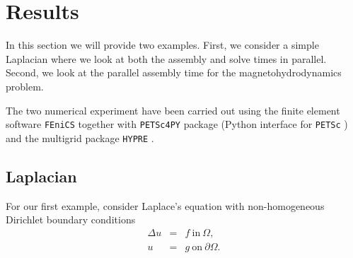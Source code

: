 \documentclass[11pt]{article}
\newcommand{\fenics}{{\tt FEniCS} }
\begin{document}

\cite{scotch}

\section{Results}

In this section we will provide two examples. First, we consider a simple Laplacian where we look at both the assembly and solve times in parallel. Second, we look at the parallel assembly time for the magnetohydrodynamics problem.

The two numerical experiment have been carried out using the finite element software \fenics \cite{wells2012automated} together with {\tt PETSc4PY} package (Python interface for {\tt PETSc} \cite{petsc-user-ref,petsc-web-page}) and the multigrid package {\tt HYPRE} \cite{falgout2002hypre}.%

\subsection{Laplacian}

For our first example, consider Laplace's equation with non-homogeneous Dirichlet boundary conditions
$$
\begin{array}{rcl}
    \Delta u &=& f \ \mbox{in} \ \Omega,\\
    u &=& g \ \mbox{on} \ \partial\Omega.
\end{array}
$$
\end{document}
